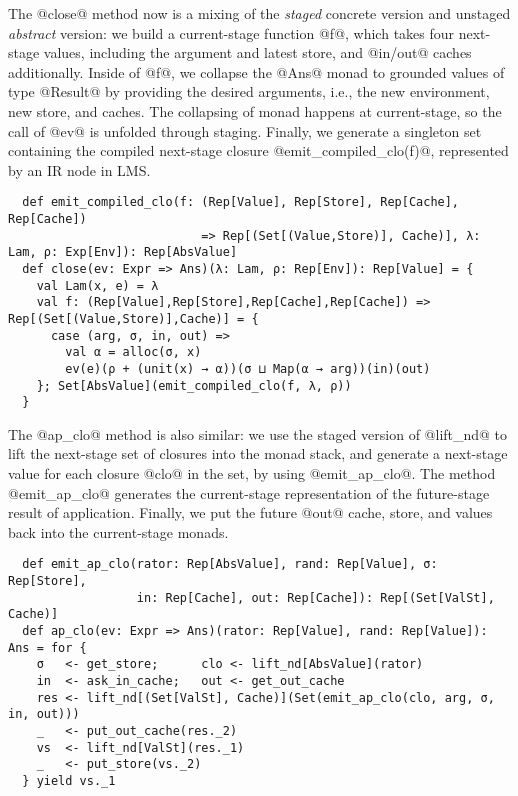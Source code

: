 The @close@ method now is a mixing of the \textit{staged} concrete version and
unstaged \textit{abstract} version: we build a current-stage function @f@, which
takes four next-stage values, including the argument and latest store, and
@in/out@ caches additionally. Inside of @f@, we collapse the @Ans@ monad to
grounded values of type @Result@ by providing the desired arguments, i.e., the
new environment, new store, and caches. The collapsing of monad happens at
current-stage, so the call of @ev@ is unfolded through staging. Finally, we
generate a singleton set containing the compiled next-stage closure
@emit_compiled_clo(f)@, represented by an IR node in LMS.
\begin{lstlisting}
  def emit_compiled_clo(f: (Rep[Value], Rep[Store], Rep[Cache], Rep[Cache])
                           => Rep[(Set[(Value,Store)], Cache)], λ: Lam, ρ: Exp[Env]): Rep[AbsValue]
  def close(ev: Expr => Ans)(λ: Lam, ρ: Rep[Env]): Rep[Value] = {
    val Lam(x, e) = λ
    val f: (Rep[Value],Rep[Store],Rep[Cache],Rep[Cache]) => Rep[(Set[(Value,Store)],Cache)] = {
      case (arg, σ, in, out) =>
        val α = alloc(σ, x)
        ev(e)(ρ + (unit(x) → α))(σ ⊔ Map(α → arg))(in)(out)
    }; Set[AbsValue](emit_compiled_clo(f, λ, ρ))
  }
\end{lstlisting}

The @ap_clo@ method is also similar: we use the staged version of @lift_nd@ to
lift the next-stage set of closures into the monad stack, and generate a
next-stage value for each closure @clo@ in the set, by using @emit_ap_clo@. The
method @emit_ap_clo@ generates the current-stage representation of the
future-stage result of application.
Finally, we put the future @out@ cache, store, and values back into
the current-stage monads.
\begin{lstlisting}
  def emit_ap_clo(rator: Rep[AbsValue], rand: Rep[Value], σ: Rep[Store],
                  in: Rep[Cache], out: Rep[Cache]): Rep[(Set[ValSt], Cache)]
  def ap_clo(ev: Expr => Ans)(rator: Rep[Value], rand: Rep[Value]): Ans = for {
    σ   <- get_store;      clo <- lift_nd[AbsValue](rator)
    in  <- ask_in_cache;   out <- get_out_cache
    res <- lift_nd[(Set[ValSt], Cache)](Set(emit_ap_clo(clo, arg, σ, in, out)))
    _   <- put_out_cache(res._2)
    vs  <- lift_nd[ValSt](res._1)
    _   <- put_store(vs._2)
  } yield vs._1
\end{lstlisting}


